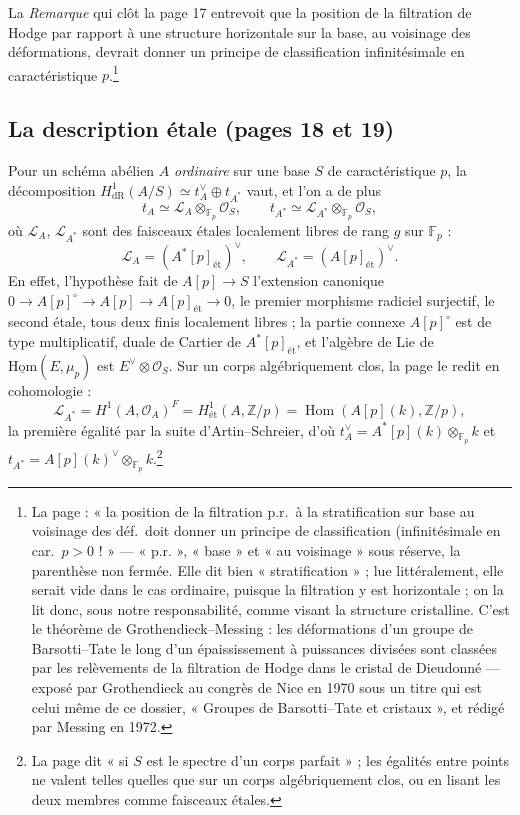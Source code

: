 \documentclass[11pt,a4paper]{article}
\begin{document}
La \emph{Remarque} qui clôt la page 17 entrevoit que la position de la
filtration de Hodge par rapport à une structure horizontale sur la base, au
voisinage des déformations, devrait donner un principe de classification
infinitésimale en caractéristique $p$.\footnote{La page : « la position de la
filtration p.r.\ à la stratification sur base au voisinage des déf.\ doit
donner un principe de classification (infinitésimale en car.\ $p > 0$ ! » ---
« p.r. », « base » et « au voisinage » sous réserve, la parenthèse non
fermée. Elle dit bien « stratification » ; lue littéralement, elle serait vide
dans le cas ordinaire, puisque la filtration y est horizontale ; on la lit
donc, sous notre responsabilité, comme visant la structure cristalline. C'est le théorème de Grothendieck--Messing :
les déformations d'un groupe de Barsotti--Tate le long d'un épaississement à
puissances divisées sont classées par les relèvements de la filtration de
Hodge dans le cristal de Dieudonné --- exposé par Grothendieck au congrès de
Nice en 1970 sous un titre qui est celui même de ce dossier, « Groupes de
Barsotti--Tate et cristaux », et rédigé par Messing en 1972.}

\subsection*{La description étale (pages 18 et 19)}

Pour un schéma abélien $A$ \emph{ordinaire} sur une base $S$ de
caractéristique $p$, la décomposition $H^1_{\mathrm{dR}}(A/S) \simeq t_A^\vee
\oplus t_{A^*}$ vaut, et l'on a de plus
\[
t_A \simeq \mathcal{L}_A \otimes_{\mathbb{F}_p} \mathcal{O}_S , \qquad
t_{A^*} \simeq \mathcal{L}_{A^*} \otimes_{\mathbb{F}_p} \mathcal{O}_S ,
\]
où $\mathcal{L}_A$, $\mathcal{L}_{A^*}$ sont des faisceaux étales localement
libres de rang $g$ sur $\mathbb{F}_p$ :
\[
\mathcal{L}_A = (A^*[p]_{\text{ét}})^\vee , \qquad \mathcal{L}_{A^*} =
(A[p]_{\text{ét}})^\vee .
\]
En effet, l'hypothèse fait de $A[p] \to S$ l'extension canonique $0 \to
A[p]^\circ \to A[p] \to A[p]_{\text{ét}} \to 0$, le premier morphisme radiciel
surjectif, le second étale, tous deux finis localement libres ; la partie
connexe $A[p]^\circ$ est de type multiplicatif, duale de Cartier de
$A^*[p]_{\text{ét}}$, et l'algèbre de Lie de $\underline{\mathrm{Hom}}(E,
\mu_p)$ est $E^\vee \otimes \mathcal{O}_S$. Sur un corps algébriquement clos, la
page le redit en cohomologie :
\[
\mathcal{L}_{A^*} = H^1(A, \mathcal{O}_A)^{F} = H^1_{\text{ét}}(A,
\mathbb{Z}/p) = \operatorname{Hom}(A[p](k), \mathbb{Z}/p) ,
\]
la première égalité par la suite d'Artin--Schreier, d'où $t_A^\vee =
A^*[p](k) \otimes_{\mathbb{F}_p} k$ et $t_{A^*} = A[p](k)^\vee
\otimes_{\mathbb{F}_p} k$.\footnote{La page dit « si $S$ est le spectre d'un
corps parfait » ; les égalités entre points ne valent telles quelles que sur
un corps algébriquement clos, ou en lisant les deux membres comme faisceaux
étales.}
\end{document}
